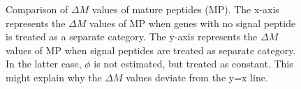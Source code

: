 \documentclass[11pt]{labbook}
\begin{document}
\begin{figure}[H]
\caption{Comparison of $\Delta\mathit{M}$ values of mature peptides (MP). The x-axis represents the $\Delta\mathit{M}$ values of MP when genes with no signal peptide is treated as a separate category. The y-axis represents the $\Delta\mathit{M}$ values of MP when signal peptides are treated as separate category. In the latter case, $\phi$ is not estimated, but treated as constant. This might explain why the $\Delta\mathit{M}$ values deviate from the y=x line.}
\end{figure}
\end{document}
